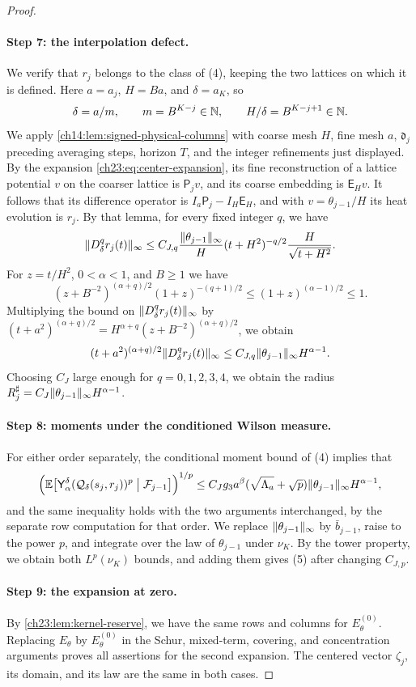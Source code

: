 \begin{proof}
\paragraph{Step 7: the interpolation defect.}
We verify that $r_j$ belongs to the class of (4), keeping the two lattices on which it is defined. Here $a=a_j$, $H=Ba$, and $\delta=a_K$, so
\[
 \delta=a/m,\qquad m=B^{K-j}\in\mathbb N,\qquad H/\delta=B^{K-j+1}\in\mathbb N.
\]
We apply \cref{ch14:lem:signed-physical-columns} with coarse mesh $H$, fine mesh $a$, $\mathfrak d_j$ preceding averaging steps, horizon $T$, and the integer refinements just displayed. By the expansion \eqref{ch23:eq:center-expansion}, its fine reconstruction of a lattice potential $v$ on the coarser lattice is $\mathsf P_jv$, and its coarse embedding is $\mathsf E_Hv$. It follows that its difference operator is $I_a\mathsf P_j-I_H\mathsf E_H$, and with $v=\theta_{j-1}/H$ its heat evolution is $r_j$. By that lemma, for every fixed integer $q$, we have
\[
 \lVert D_\delta^qr_j(t)\rVert_\infty\le C_{J,q}\frac{\lVert \theta_{j-1}\rVert_\infty}{H}(t+H^2)^{-q/2}\frac{H}{\sqrt{t+H^2}}.
\]
For $z=t/H^2$, $0<\alpha<1$, and $B\ge1$ we have
\[
 (z+B^{-2})^{(\alpha+q)/2}(1+z)^{-(q+1)/2}\le(1+z)^{(\alpha-1)/2}\le1.
\]
Multiplying the bound on $\lVert D_\delta^qr_j(t)\rVert_\infty$ by $(t+a^2)^{(\alpha+q)/2}=H^{\alpha+q}(z+B^{-2})^{(\alpha+q)/2}$, we obtain
\[
 (t+a^2)^{(\alpha+q)/2}\lVert D_\delta^qr_j(t)\rVert_\infty\le C_{J,q}\lVert \theta_{j-1}\rVert_\infty H^{\alpha-1}.
\]
Choosing $C_J$ large enough for $q=0,1,2,3,4$, we obtain the radius $R_j^\sharp=C_J\lVert \theta_{j-1}\rVert_\infty H^{\alpha-1}$.

\paragraph{Step 8: moments under the conditioned Wilson measure.}
For either order separately, the conditional moment bound of (4) implies that
\[
 \Bigl(\mathbb E\bigl[\mathsf Y_{\alpha}^{\delta}(\mathcal Q_\delta(s_j,r_j))^p\bigm|\mathcal F_{j-1}\bigr]\Bigr)^{1/p}\le C_Jg_3a^\beta(\sqrt{\Lambda_a}+\sqrt p)\lVert \theta_{j-1}\rVert_\infty H^{\alpha-1},
\]
and the same inequality holds with the two arguments interchanged, by the separate row computation for that order. We replace $\lVert \theta_{j-1}\rVert_\infty$ by $\bar b_{j-1}$, raise to the power $p$, and integrate over the law of $\theta_{j-1}$ under $\nu_K$. By the tower property, we obtain both $L^p(\nu_K)$ bounds, and adding them gives (5) after changing $C_{J,p}$.

\paragraph{Step 9: the expansion at zero.}
By \cref{ch23:lem:kernel-reserve}, we have the same rows and columns for $E_\theta^{(0)}$. Replacing $E_\theta$ by $E_\theta^{(0)}$ in the Schur, mixed-term, covering, and concentration arguments proves all assertions for the second expansion. The centered vector $\zeta_j$, its domain, and its law are the same in both cases.
\end{proof}

